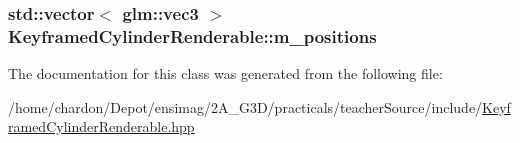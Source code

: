 \hypertarget{classKeyframedCylinderRenderable_a6429ca81b8b337a5b2fdbf25e5a232d2}{
\subsubsection[{m\+\_\+positions}]{\setlength{\rightskip}{0pt plus 5cm}std\+::vector$<$ glm\+::vec3 $>$ Keyframed\+Cylinder\+Renderable\+::m\+\_\+positions\hspace{0.3cm}{\ttfamily [private]}}}\label{classKeyframedCylinderRenderable_a6429ca81b8b337a5b2fdbf25e5a232d2}


The documentation for this class was generated from the following file\+:\begin{DoxyCompactItemize}
\item 
/home/chardon/\+Depot/ensimag/2\+A\+\_\+\+G3\+D/practicals/teacher\+Source/include/\hyperlink{KeyframedCylinderRenderable_8hpp}{Keyframed\+Cylinder\+Renderable.\+hpp}\end{DoxyCompactItemize}
